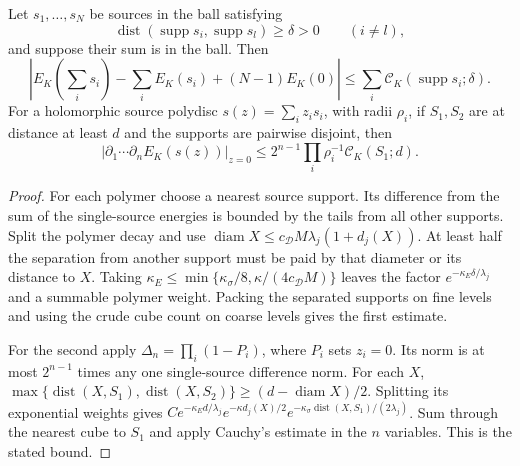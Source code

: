 \documentclass[11pt,letterpaper,reqno]{amsart}
\makeatletter
\theoremstyle{definition}
\newcommand{\ms@minorstart}{%
  \pushQED{\qed}\renewcommand{\qedsymbol}{$\blacksquare$}}
\newenvironment{proposition}[1][]{\ms@minorstart\ms@proposition[#1]}
  {\popQED\endms@proposition}
\theoremstyle{remark}
\makeatother
\begin{document}
\begin{proposition}[Separated source energies]\label{C-407-25}
Let $s_1,\ldots,s_N$ be sources in the ball satisfying
\[
 \operatorname{dist}(\operatorname{supp}s_i,\operatorname{supp}s_l)
 \ge\delta>0\qquad(i\ne l),
\]
and suppose their sum is in the ball. Then
\[
 \left|E_K(\sum_i s_i)-\sum_iE_K(s_i)+(N-1)E_K(0)\right|
 \le\sum_i\mathscr C_K(\operatorname{supp}s_i;\delta).
\]
For a holomorphic source polydisc $s(z)=\sum_i z_is_i$,
with radii $\rho_i$, if $S_1,S_2$ are at distance at least
$d$ and the supports are pairwise disjoint, then
\[
 |\partial_1\cdots\partial_n E_K(s(z))|_{z=0}
 \le2^{n-1}\prod_i\rho_i^{-1}\mathscr C_K(S_1;d).
\]
\end{proposition}
\begin{proof}
For each polymer choose a nearest source support. Its
difference from the sum of the single-source energies
is bounded by the tails from all other supports. Split
the polymer decay and use
$\operatorname{diam}X\le c_{\mathcal D}M\lambda_j(1+d_j(X))$.
At least half the separation from another support must
be paid by that diameter or its distance to $X$.
Taking $\kappa_E\le\min\{\kappa_\sigma/8,
\kappa/(4c_{\mathcal D}M)\}$ leaves the factor
$e^{-\kappa_E\delta/\lambda_j}$ and a summable polymer
weight. Packing the separated supports on fine levels
and using the crude cube count on coarse levels gives
the first estimate.

For the second apply
$\Delta_n=\prod_i(1-P_i)$, where $P_i$ sets $z_i=0$.
Its norm is at most $2^{n-1}$ times any one single-source
difference norm. For each $X$,
$\max\{\operatorname{dist}(X,S_1),\operatorname{dist}(X,S_2)\}
\ge(d-\operatorname{diam}X)/2$.
Splitting its exponential weights gives
$Ce^{-\kappa_Ed/\lambda_j}e^{-\kappa d_j(X)/2}
e^{-\kappa_\sigma\operatorname{dist}(X,S_1)/(2\lambda_j)}$.
Sum through the nearest cube to $S_1$ and apply Cauchy's
estimate in the $n$ variables. This is the stated bound.
\end{proof}
\end{document}
